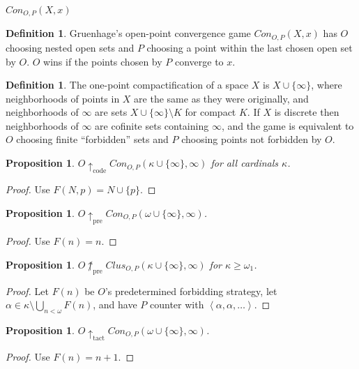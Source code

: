 \documentclass[11pt]{article}
\theoremstyle{plain}
\newtheorem{proposition}[theorem]{Proposition}
\theoremstyle{definition}
\newtheorem{definition}[theorem]{Definition}
\theoremstyle{remark}
\newcommand{\prewin}{\uparrow_{\text{pre}}}
\newcommand{\tactwin}{\uparrow_{\text{tact}}}
\newcommand{\codewin}{\uparrow_{\text{code}}}
\newcommand{\oneptcomp}[1]{#1\cup\{\infty\}}
\newcommand{\congame}[2]{Con_{O,P}(#1,#2)}
\newcommand{\clusgame}[2]{Clus_{O,P}(#1,#2)}
\begin{document}
\centerline{\bf $Con_{O,P}(X,x)$}

\begin{definition} 
Gruenhage's open-point convergence game $\congame{X}{x}$ has $O$ choosing nested open sets and $P$ choosing a point within the last chosen open set by $O$. $O$ wins if the points chosen by $P$ converge to $x$.
\end{definition}

\begin{definition}
The one-point compactification of a space $X$ is $\oneptcomp{X}$, where neighborhoods of points in $X$ are the same as they were originally, and neighborhoods of $\infty$ are sets $\oneptcomp{X}\setminus K$ for compact $K$. If $X$ is discrete then neighborhoods of $\infty$ are cofinite sets containing $\infty$, and the game is equivalent to $O$ choosing finite ``forbidden'' sets and $P$ choosing points not forbidden by $O$.
\end{definition}

\begin{proposition}
$O\codewin \congame{\oneptcomp{\kappa}}{\infty}$ for all cardinals $\kappa$.
\end{proposition}

\begin{proof}
Use $F(N,p)=N\cup\{p\}$.
\end{proof}

\begin{proposition}
$O\prewin \congame{\oneptcomp{\omega}}{\infty}$.
\end{proposition}

\begin{proof}
Use $F(n)=n$.
\end{proof}


\begin{proposition}
$O\not\prewin \clusgame{\oneptcomp{\kappa}}{\infty}$ for $\kappa\geq\omega_1$.
\end{proposition}

\begin{proof}
Let $F(n)$ be $O$'s predetermined forbidding strategy, let $\alpha\in\kappa\setminus\bigcup_{n<\omega}F(n)$, and have $P$ counter with $\left<\alpha,\alpha,\dots\right>$.
\end{proof}


\begin{proposition}
$O\tactwin\congame{\oneptcomp{\omega}}{\infty}$.
\end{proposition}

\begin{proof}
Use $F(n)=n+1$.
\end{proof}
\end{document}
